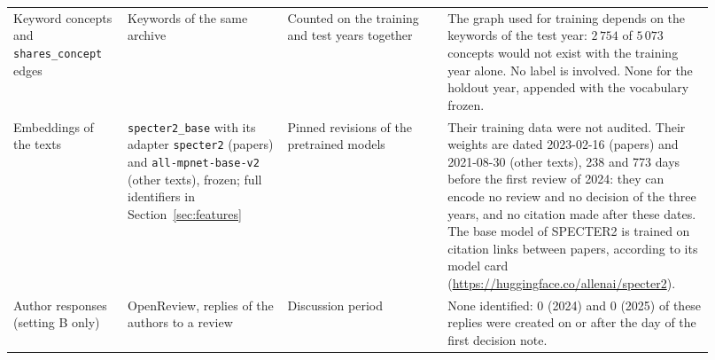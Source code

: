\begin{table}[t]
\begin{tabular}{@{}>{\raggedright\arraybackslash}p{0.15\linewidth}>{\raggedright\arraybackslash}p{0.21\linewidth}>{\raggedright\arraybackslash}p{0.21\linewidth}>{\raggedright\arraybackslash}p{0.35\linewidth}@{}}
Keyword concepts and \texttt{shares\_concept} edges & Keywords of the same archive & Counted on the training and test years together & The graph used for training depends on the keywords of the test year: $2\,754$ of $5\,073$ concepts would not exist with the training year alone. No label is involved. None for the holdout year, appended with the vocabulary frozen. \\
Embeddings of the texts & \texttt{specter2\_base} with its adapter \texttt{specter2} (papers) and \texttt{all-mpnet-base-v2} (other texts), frozen; full identifiers in Section~\ref{sec:features} & Pinned revisions of the pretrained models & Their training data were not audited. Their weights are dated 2023-02-16 (papers) and 2021-08-30 (other texts), 238 and 773 days before the first review of 2024: they can encode no review and no decision of the three years, and no citation made after these dates. The base model of SPECTER2 is trained on citation links between papers, according to its model card (\url{https://huggingface.co/allenai/specter2}). \\
Author responses (setting B only) & OpenReview, replies of the authors to a review & Discussion period & None identified: 0 (2024) and 0 (2025) of these replies were created on or after the day of the first decision note. \\
\bottomrule
\end{tabular}
\end{table}
